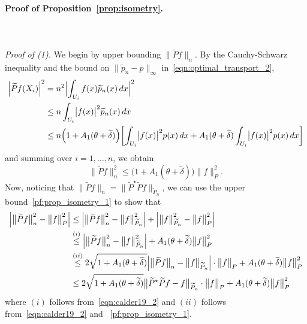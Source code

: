 \documentclass[twoside]{article}
\newcommand{\1}{\mathbf{1}}
\newcommand{\wt}[1]{\widetilde{#1}}
\theoremstyle{definition}
\theoremstyle{remark}
\begin{document}
\paragraph{Proof of Proposition~\ref{prop:isometry}.}
\mbox{}\\
\mbox{}\\
\textit{Proof of (1).}
We begin by upper bounding $\bigl\|\wt{P}f\bigr\|_{n}$. By the Cauchy-Schwarz inequality and the bound on $\|\wt{p}_n - p\|_{\infty}$ in~\eqref{eqn:optimal_transport_2},
\begin{align*}
\Bigl|\wt{P}f(X_i)\Bigr|^2 & = n^2 \Bigl|\int_{U_i} f(x) \wt{p}_n(x) \,dx\Bigr|^2 \\
& \leq n \int_{U_i} \bigl|f(x)\bigr|^2 \wt{p}_n(x) \,dx \\
& \leq n \Bigl(1 + A_1(\theta + \wt{\delta})\Bigr)\biggl[\int_{U_i} \bigl|f(x)\bigr|^2 p(x) \,dx + A_1(\theta + \wt{\delta}) \int_{U_i} \bigl|f(x)\bigr|^2 p(x) \,dx\biggr]
\end{align*}
and summing over $i = 1,\ldots,n$, we obtain
\begin{equation}
\label{pf:prop_isometry_1}
\bigl\|\wt{P}f\bigr\|_{n}^2 \leq \biggl(1 + A_1(\theta + \wt{\delta})\biggr) \bigl\|f\bigr\|_{P}^2.
\end{equation}
Now, noticing that $\bigl\|\wt{P}f\bigr\|_{n} = \bigl\|\wt{P}^{\star}\wt{P}f\bigr\|_{\wt{P}_n}$, we can use the upper bound~\eqref{pf:prop_isometry_1} to show that
\begin{align}
\Bigl|\bigl\|\wt{P}f\bigr\|_{n}^2 - \bigl\|f\bigr\|_{P}^2\Bigr| & \leq \Bigl|\bigl\|\wt{P}f\bigr\|_{n}^2 - \bigl\|f\bigr\|_{\wt{P}_n}^2\Bigr| + \Bigl|\bigl\|f\bigr\|_{\wt{P}_n}^2 - \bigl\|f\bigr\|_{P}^2\Bigr| \nonumber \\
& \overset{(i)}{\leq} \Bigl|\bigl\|\wt{P}f\bigr\|_{n}^2 - \bigl\|f\bigr\|_{\wt{P}_n}^2\Bigr|  + A_1(\theta + \wt{\delta}) \bigl\|f\bigr\|_{P}^2 \\
& \overset{(ii)}{\leq} 2 \sqrt{1 + A_1(\theta + \wt{\delta})} \Bigl|\bigl\|\wt{P}f\bigr\|_{n} - \bigl\|f\bigr\|_{\wt{P}_n}\Bigr| \cdot \bigl\|f\bigr\|_{P} + A_1(\theta + \wt{\delta}) \bigl\|f\bigr\|_{P}^2 \nonumber \\
& \leq 2 \sqrt{1 + A_1(\theta + \wt{\delta})} \bigl\|\wt{P}^{\star}\wt{P}f - f\bigr\|_{\wt{P}_n} \cdot \bigl\|f\bigr\|_{P} + A_1(\theta + \wt{\delta}) \bigl\|f\bigr\|_{P}^2 \label{pf:prop_isometry_2}
\end{align}
where $(i)$ follows from~\eqref{eqn:calder19_2} and $(ii)$ follows from~\eqref{eqn:calder19_2} and ~\eqref{pf:prop_isometry_1}. 
\end{document}
